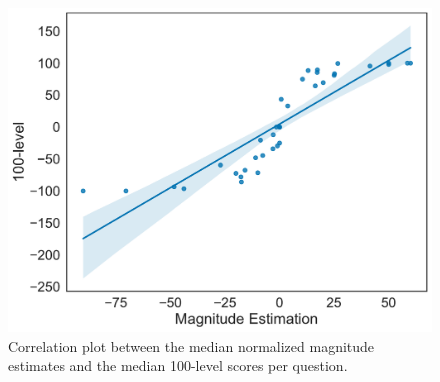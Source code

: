 \begin{figure}
    \centering
    \includegraphics[width=.6\linewidth]{Figures/correlation.pdf}
    \caption{Correlation plot between the median normalized magnitude estimates and the median 100-level scores per question.}
    \label{fig:correlation}
\end{figure}

